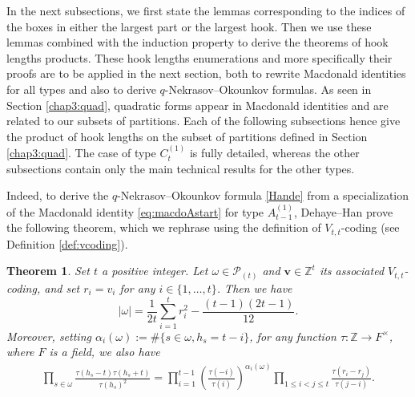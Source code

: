 \documentclass[11pt,letterpaper]{amsart}
\def\bbbz{\mathbb Z}
\def\cch{\mathcal H}
\def\ccp{\mathcal P}
\newtheorem{thm}[df]{Theorem}
\numberwithin{equation}{section}
\numberwithin{df}{section}
\begin{document}
In the next subsections, we first state the lemmas corresponding to the indices of the boxes in either the largest part or the largest hook. Then we use these lemmas combined with the induction property to derive the theorems of hook lengths products. These hook lengths enumerations and more specifically their proofs are to be applied in the next section, both to rewrite Macdonald identities for all types and also to derive $q$-Nekrasov--Okounkov formulas.  As seen in Section \ref{chap3:quad}, quadratic forms appear in Macdonald identities and are related to our subsets of partitions. Each of the following subsections hence give the product of hook lengths on the subset of partitions defined in Section \ref{chap3:quad}. The case of type $C^{(1)}_{t}$ is fully detailed, whereas the other subsections contain only the main technical results for the other types.

Indeed, to derive the $q$-Nekrasov--Okounkov formula \eqref{Hande} from a specialization of the Macdonald identity \eqref{eq:macdoAstart} for type $A^{(1)}_{t-1}$, Dehaye--Han prove the following theorem, which we rephrase using the definition of $V_{t,t}$-coding (see Definition \ref{def:vcoding}).

\begin{thm}\label{thm:HD}
Set $t$ a positive integer. Let $\omega\in \ccp_{(t)}$ and $\mathbf{v}\in\bbbz^{t}$ its associated $V_{t,t}$-coding, and set $r_i=v_i$ for any $i\in\lbrace1,\dots,t\rbrace$. Then we have
\begin{equation}\label{eq:ppoids}
\lvert \omega\rvert = \frac{1}{2t}\sum_{i=1}^{t} r_i^2-\frac{(t-1)(2t-1)}{12}.
\end{equation}
Moreover, setting $\alpha_i(\omega):=\#\lbrace s\in\omega, h_s=t-i\rbrace$, for any function $\tau:\bbbz\rightarrow F^{\times}$, where $F$ is a field, we also have
\begin{align}\label{eq:thmp}
\prod_{s\in\omega}\frac{\tau(h_s-t)\tau(h_s+t)}{\tau(h_s)^2}=\prod_{i=1}^{t-1}\left(\frac{\tau(-i)}{\tau(i)}\right)^{\alpha_i(\omega)}
\prod_{1\leq i<j\leq t} \frac{\tau(r_i-r_j)}{\tau(j-i)}.
\end{align}


\end{thm}
\end{document}
